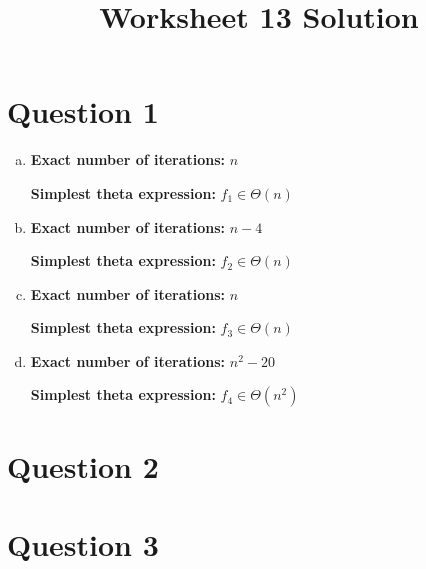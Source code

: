 \documentclass[12pt]{article}
\begin{document}
\title{Worksheet 13 Solution}
\maketitle

\section*{Question 1}
\begin{enumerate}[a.]
    \item

    \textbf{Exact number of iterations:} $n$

    \textbf{Simplest theta expression:} $f_1 \in \Theta (n)$

    \item

    \textbf{Exact number of iterations:} $n-4$

    \textbf{Simplest theta expression:} $f_2 \in \Theta (n)$

    \item

    \textbf{Exact number of iterations:} $n$

    \textbf{Simplest theta expression:} $f_3 \in \Theta (n)$

    \item

    \textbf{Exact number of iterations:} $n^2-20$

    \textbf{Simplest theta expression:} $f_4 \in \Theta (n^2)$
\end{enumerate}

\section*{Question 2}

\section*{Question 3}
\end{document}
